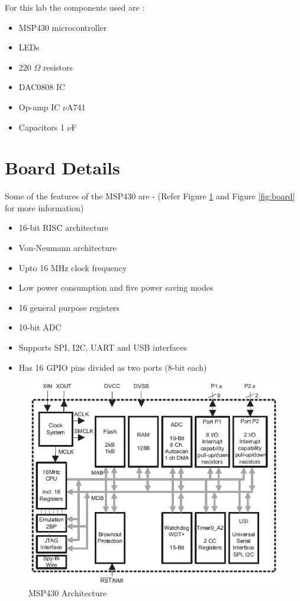 \documentclass[12pt, letterpaper]{article}
\begin{document}
For this lab the components used are :

\begin{itemize}
	\item MSP430 microcontroller
	\item LEDs
	\item 220 $\Omega$ resistors
	\item DAC0808 IC 
	\item Op-amp IC $\nu$A741
	\item Capacitors 1 $\nu$F
\end{itemize}

\section{Board Details}

Some of the features of the MSP430 are - (Refer Figure \ref{fig:architecture} and Figure \ref{fig:board} for more information)

\begin{itemize}
	\item 16-bit RISC architecture
	\item Von-Neumann architecture
	\item Upto 16 MHz clock frequency
	\item Low power consumption and five power saving modes
	\item 16 general purpose registers
	\item 10-bit ADC
	\item Supports SPI, I2C, UART and USB interfaces
	\item Has 16 GPIO pins divided as two ports (8-bit each)
\end{itemize}
	
\begin{figure}[t]
	\centering
	\includegraphics[scale=0.8]{msp430g2231-ep-ti.png}
	\caption{MSP430 Architecture}
	\label{fig:architecture}
\end{figure}
\end{document}
